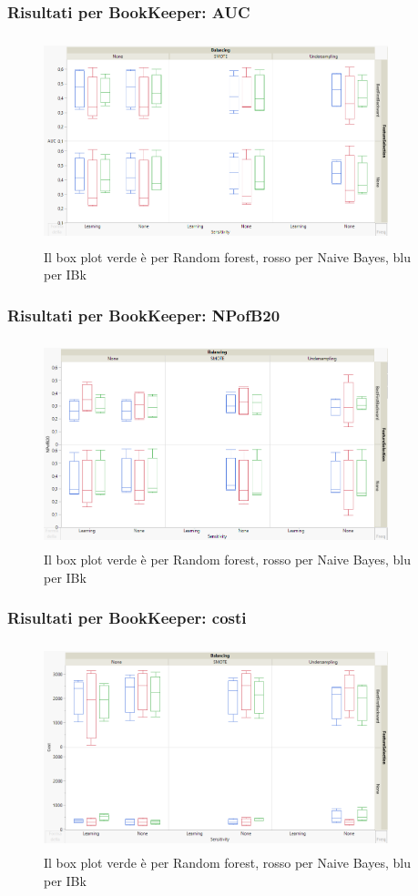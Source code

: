\documentclass{beamer}
\begin{document}
\begin{frame}
	\frametitle{Risultati per BookKeeper: AUC}
	
	\centering
	\begin{figure}
	\includegraphics[width=10cm, height=6cm]{bookkeeper-auc}
	\caption{Il box plot verde è per Random forest, rosso per Naive Bayes, blu per IBk}
	\end{figure}
\end{frame}

\begin{frame}
	\frametitle{Risultati per BookKeeper: NPofB20}
	
	\centering
	\begin{figure}
	\includegraphics[width=10cm, height=6cm]{bookkeeper-npofb20}
	\caption{Il box plot verde è per Random forest, rosso per Naive Bayes, blu per IBk}
	\end{figure}
\end{frame}

\begin{frame}
	\frametitle{Risultati per BookKeeper: costi}
	
	\centering
	\begin{figure}
	\includegraphics[width=10cm, height=6cm]{bookkeeper-cost}
	\caption{Il box plot verde è per Random forest, rosso per Naive Bayes, blu per IBk}
	\end{figure}
\end{frame}
\end{document}
